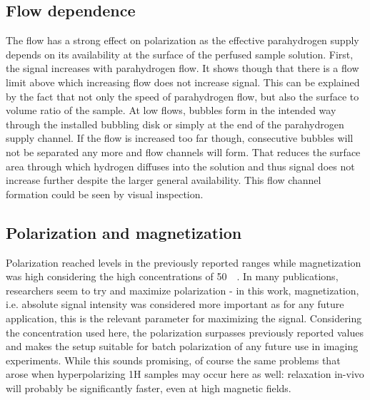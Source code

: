         \subsection{Flow dependence}
            The flow has a strong effect on polarization as the effective parahydrogen supply depends on its availability at the surface of the perfused sample solution. First, the signal increases with parahydrogen flow. It shows though that there is a flow limit above which increasing flow does not increase signal. This can be explained by the fact that not only the speed of parahydrogen flow, but also the surface to volume ratio of the sample. At low flows, bubbles form in the intended way through the installed bubbling disk or simply at the end of the parahydrogen supply channel. If the flow is increased too far though, consecutive bubbles will not be separated any more and flow channels will form. That reduces the surface area through which hydrogen diffuses into the solution and thus signal does not increase further despite the larger general availability. This flow channel formation could be seen by visual inspection.
        \subsection{Polarization and magnetization}
            Polarization reached levels in the previously reported ranges while magnetization was high considering the high concentrations of \SI{50}{\milli\molar}. In many publications, researchers seem to try and maximize polarization - in this work, magnetization, i.e. absolute signal intensity was considered more important as for any future application, this is the relevant parameter for maximizing the signal. Considering the concentration used here, the polarization surpasses previously reported values and makes the setup suitable for batch polarization of any future use in imaging experiments. While this sounds promising, of course the same problems that arose when hyperpolarizing 1H samples may occur here as well: relaxation in-vivo will probably be significantly faster, even at high magnetic fields.
